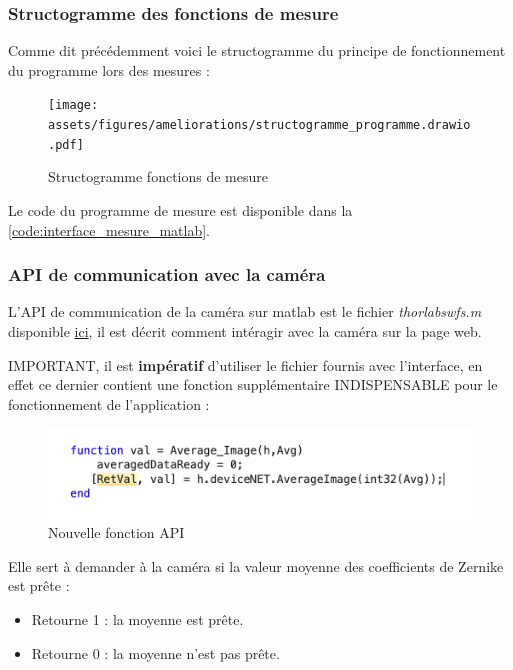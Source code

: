 \subsubsection{Structogramme des fonctions de mesure}
Comme dit précédemment voici le structogramme du principe de fonctionnement du programme lors des mesures :
\begin{figure}[H]
    \centering
    \texttt{[image: assets/figures/ameliorations/structogramme\_programme.drawio.pdf]}
    \caption{Structogramme fonctions de mesure}
\end{figure}
Le code du programme de mesure est disponible dans la \autoref{code:interface_mesure_matlab}.

\subsubsection{API de communication avec la caméra}
L'API de communication de la caméra sur matlab est le fichier \textit{thorlabswfs.m} disponible \href{https://ch.mathworks.com/matlabcentral/fileexchange/116485-driver-for-thorlabs-shack-hartmann-wavefront-sensors-wfs}{ici},
il est décrit comment intéragir avec la caméra sur la page web.

\color{red}IMPORTANT\color{black}, il est \textbf{impératif} d'utiliser le fichier fournis avec l'interface, en effet ce dernier contient une fonction supplémentaire INDISPENSABLE pour le fonctionnement de l'application :
\begin{figure}[H]
    \centering
    \includegraphics[width = \textwidth,]{assets/figures/ameliorations/nouvelle_fonction_API.png}
    \caption{Nouvelle fonction API}
\end{figure}
Elle sert à demander à la caméra si la valeur moyenne des coefficients de Zernike est prête :
\begin{itemize}
    \item Retourne 1 : la moyenne est prête.
    \item Retourne 0 : la moyenne n'est pas prête.
\end{itemize}

